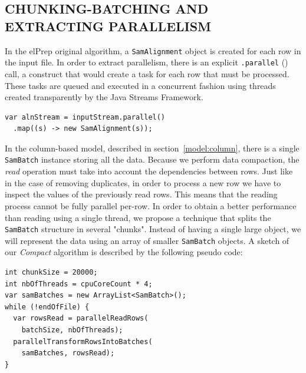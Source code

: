 \documentclass[a4paper,twoside]{article}
\begin{document}
\subsection{\uppercase{Chunking-Batching and Extracting Parallelism}}\label{subsec:uppercase10}
In the elPrep original algorithm, a {\texttt{SamAlignment} } object is created for each row in the input file.
In order to extract parallelism, there is an explicit {\texttt{.parallel} ()} call, a construct that would create a task for each row that must be processed.
These tasks are queued and executed in a concurrent fashion using threads created transparently by the Java Streams Framework.
\begin{verbatim}
var alnStream = inputStream.parallel()
  .map((s) -> new SamAlignment(s));
\end{verbatim}
In the column-based model, described in section~\ref{model:column}, there is a single {\texttt{SamBatch} } instance storing all the data.
Because we perform data compaction, the {\textit{read} } operation must take into account the dependencies between rows.
Just like in the case of removing duplicates, in order to process a new row we have to inspect the values of the previously read rows.
This means that the reading process cannot be fully parallel per-row.
In order to obtain a better performance than reading using a single thread, we propose a technique that splits the {\texttt{SamBatch} } structure in several "chunks".
Instead of having a single large object, we will represent the data using an array of smaller {\texttt{SamBatch} } objects.
A sketch of our {\textit{Compact} } algorithm is described by the following pseudo code:

\begin{verbatim}
int chunkSize = 20000;
int nbOfThreads = cpuCoreCount * 4;
var samBatches = new ArrayList<SamBatch>();
while (!endOfFile) {
  var rowsRead = parallelReadRows(
    batchSize, nbOfThreads);
  parallelTransformRowsIntoBatches(
    samBatches, rowsRead);
}
\end{verbatim}
\end{document}
